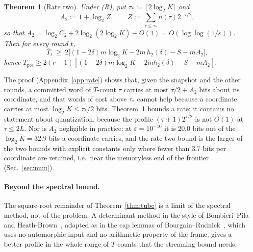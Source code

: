 \documentclass[aps,prx,twocolumn,superscriptaddress,nofootinbib,longbibliography]{revtex4-2}
\theoremstyle{plain}
\newtheorem{theorem}{Theorem}
\theoremstyle{definition}
\theoremstyle{remark}
\newcommand{\Tpre}{T_{\mathrm{pre}}}
\begin{document}
\begin{theorem}[Rate two]\label{thm:rate2}
Under (R), put $\tau_*:=\lceil2\log_2K\rceil$ and
\begin{equation}\label{eq:A2}
A_2:=1+\log_2 Z,\qquad Z:=\sum_{\tau\le\tau_*}n(\tau)2^{-\tau/2},
\end{equation}
so that $A_2=\log_2C_2+2\log_2(2\log_2K)+O(1)=O(\log\log(1/\varepsilon))$. Then for every round $t$,
\begin{equation}
\bar T_t\ \ge\ 2\big[(1-2\delta)m\log_2K-2m\,h_2(\delta)-S-mA_2\big],
\end{equation}
hence $\bar\Tpre\ge2(r-1)[(1-2\delta)m\log_2K-2mh_2(\delta)-S-mA_2]$.
\end{theorem}
The proof (Appendix~\ref{app:rate}) shows that, given the snapshot and the other rounds, a committed word of $T$-count $\tau$ carries at most $\tau/2+A_2$ bits about its coordinate, and that words of cost above $\tau_*$ cannot help because a coordinate carries at most $\log_2K\le\tau_*/2$ bits. Theorem~\ref{thm:rate2} bounds a rate; it contains no statement about quantization, because the profile $(\tau+1)2^{\tau/2}$ is not $O(1)$ at $\tau\le2L$. Nor is $A_2$ negligible in practice: at $\varepsilon=10^{-10}$ it is $20.0$ bits out of the $\log_2K=32.9$ bits a coordinate carries, and the rate-two bound is the larger of the two bounds with explicit constants only where fewer than $3.7$ bits per coordinate are retained, i.e.\ near the memoryless end of the frontier (Sec.~\ref{sec:num}).


\paragraph{Beyond the spectral bound.} The square-root remainder of Theorem~\ref{thm:tube} is a limit of the spectral method, not of the problem. A determinant method in the style of Bombieri--Pila and Heath-Brown~\cite{BombieriPila,HeathBrown}, adapted as in the cap lemmas of Bourgain--Rudnick~\cite{BourgainRudnick}, which uses no automorphic input and no arithmetic property of the frame, gives a better profile in the whole range of $T$-counts that the streaming bound needs.
\end{document}

